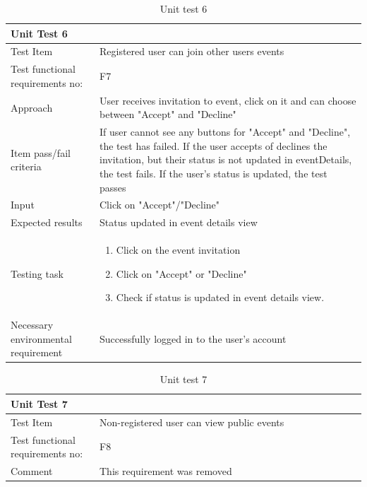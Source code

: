 \begin{table}[H]
\begin{tabular}{ | L{0.25\linewidth} | L{0.75\linewidth} | } 
 \hline {}
 Unit Test 6 &  \\
 \hline
 Test Item & Registered user can join other users events\\ 
 \hline
 Test functional requirements no: & F7
 \\ 
 \hline
 Approach & User receives invitation to event, click on it and can choose between "Accept" and "Decline" \\ 
  \hline
 Item pass/fail criteria &  If user cannot see any buttons for "Accept" and "Decline", the test has failed. If the user accepts of declines the invitation, but their status is not updated in eventDetails, the test fails. If the user's status is updated, the test passes  \\ 
 \hline
 Input &  Click on "Accept"/"Decline"\\ 
 \hline
 Expected results & Status updated in event details view \\ 
  \hline
Testing task & 
\vspace{-5mm}
    \begin{enumerate}[noitemsep]
  \item Click on the event invitation
  \item Click on "Accept" or "Decline"
  \item Check if status is updated in event details view.
   \end{enumerate}\\
 \hline
 Necessary environmental requirement & Successfully logged in to the user's account \\ 
 \hline
\end{tabular}
\caption{Unit test 6}
\end{table}


\begin{table}[H]
\begin{tabular}{ | L{0.25\linewidth} | L{0.75\linewidth} | } 
 \hline {}
 Unit Test 7 &  \\
 \hline
 Test Item & Non-registered user can view public events\\
 \hline
 Test functional requirements no: & F8
 \\
 \hline
 Comment & This requirement was removed\\
 \hline
\end{tabular}
\caption{Unit test 7}
\end{table}

